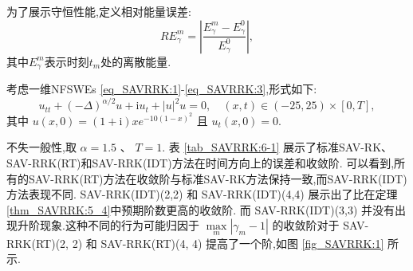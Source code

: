 为了展示守恒性能,定义相对能量误差:
\begin{equation}\label{eq_SAVRRK:105}
	R E_{\gamma}^{m} = \left|\frac{E_{\gamma}^{m} - E_{\gamma}^{0}}{E_{\gamma}^{0}}\right|,
\end{equation}
其中$E_{\gamma}^{m}$表示时刻$t_m$处的离散能量.

\begin{example}\label{exp_SAVRRK:1} 
	考虑一维NFSWEs \eqref{eq_SAVRRK:1}-\eqref{eq_SAVRRK:3},形式如下\cite{ranLinearlyImplicitConservative2016}:
	\begin{equation}\label{eq_SAVRRK:108}
		u_{t t}+(-\Delta)^{\alpha / 2} u+\mathrm{i}u_t+|u|^2 u=0, \quad (x,t)\in  (-25, 25)\times[0, T],
	\end{equation}
	其中 $u(x, 0)=(1+\mathrm{i}) x e^{-10(1-x)^2}$ 且 $u_t(x, 0)=0$.
	\end{example}
	不失一般性,取 $\alpha=1.5$ 、 $T=1$. %
	表 \ref{tab_SAVRRK:6-1} 展示了标准SAV-RK、SAV-RRK(RT)和SAV-RRK(IDT)方法在时间方向上的误差和收敛阶.
	可以看到,所有的SAV-RRK(RT)方法在收敛阶与标准SAV-RK方法保持一致,而SAV-RRK(IDT)方法表现不同.
	SAV-RRK(IDT)(2,2) 和 SAV-RRK(IDT)(4,4) 展示出了比在定理\ref{thm_SAVRRK:5_4}中预期阶数更高的收敛阶.
	而 SAV-RRK(IDT)(3,3) 并没有出现升阶现象.这种不同的行为可能归因于 $\max\limits _m\left|\gamma_m-1\right|$ 
	的收敛阶对于 SAV-RRK(RT)(2, 2) 和 SAV-RRK(RT)(4, 4) 提高了一个阶,如图 \ref{fig_SAVRRK:1} 所示.


